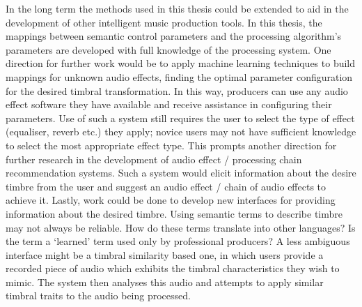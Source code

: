	In the long term the methods used in this thesis could be extended to aid in the development of other intelligent
	music production tools. In this thesis, the mappings between semantic control parameters and the processing
	algorithm's parameters are developed with full knowledge of the processing system. One direction for further work
	would be to apply machine learning techniques to build mappings for unknown audio effects, finding the optimal
	parameter configuration for the desired timbral transformation. In this way, producers can use any audio effect
	software they have available and receive assistance in configuring their parameters. Use of such a system still
	requires the user to select the type of effect (equaliser, reverb etc.) they apply; novice users may not have
	sufficient knowledge to select the most appropriate effect type. This prompts another direction for further research
	in the development of audio effect / processing chain recommendation systems. Such a system would elicit information
	about the desire timbre from the user and suggest an audio effect / chain of audio effects to achieve it. Lastly,
	work could be done to develop new interfaces for providing information about the desired timbre. Using semantic
	terms to describe timbre may not always be reliable. How do these terms translate into other languages? Is the term
	a `learned' term used only by professional producers? A less ambiguous interface might be a timbral similarity based
	one, in which users provide a recorded piece of audio which exhibits the timbral characteristics they wish to mimic.
	The system then analyses this audio and attempts to apply similar timbral traits to the audio being processed.
